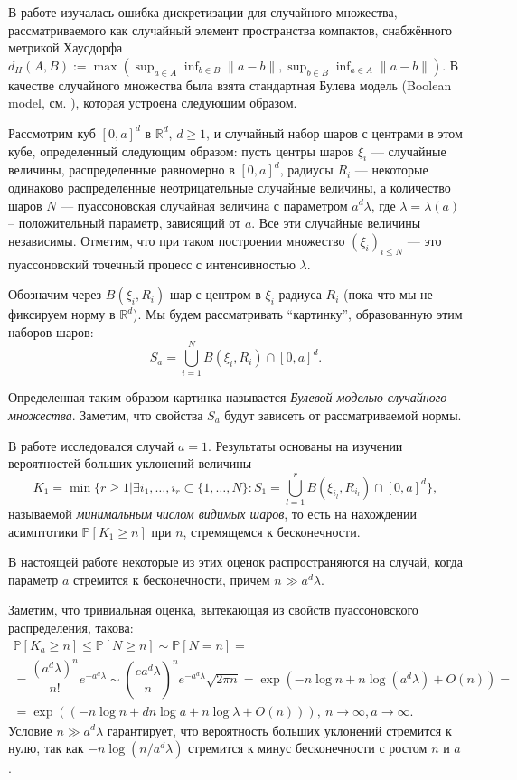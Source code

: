 \documentclass[12pt]{article}
\theoremstyle{plain}
\theoremstyle{definition}
\theoremstyle{remark}
\def\geq{\geqslant}
\def\leq{\leqslant}
\newcommand{\cuplim}{\bigcup\limits}
\newcommand{\R}{\mathbb{R}}
\newcommand{\PP}{\mathbb{P}}
\begin{document}
В работе \cite{AL} изучалась ошибка дискретизации для случайного множества,
рассматриваемого как случайный элемент пространства компактов, снабжённого метрикой Хаусдорфа $d_H(A, B) := \max(\sup_{a\in A}\inf_{b\in B}\|a - b\|, \sup_{b\in B}\inf_{a\in A}\|a - b\|)$.
В качестве случайного множества была взята стандартная Булева модель (Boolean model, см. \cite{CSKM, SW}), которая
устроена следующим образом.

Рассмотрим куб $[0,a]^d$ в $\R^d$, $d \geq 1$, и  случайный набор шаров с центрами в этом кубе, определенный следующим образом: пусть  центры шаров $\xi_i$ ---  случайные величины, распределенные равномерно в $[0,a]^d$, радиусы $R_i$ --- некоторые одинаково распределенные неотрицательные случайные величины, а количество шаров $N$ --- пуассоновская случайная величина с параметром $a^d\lambda$, где $\lambda = \lambda(a)$ -- положительный параметр, зависящий от $a$. Все эти случайные величины независимы. Отметим, что при таком построении множество $(\xi_i)_{i\leq N}$ --- это пуассоновский точечный процесс с интенсивностью $\lambda$.

Обозначим через $B(\xi_i, R_i)$ шар с центром в $\xi_i$ радиуса $R_i$ (пока что мы не фиксируем норму в $\R^d$).
Мы будем рассматривать  ``картинку'', образованную этим наборов шаров:
$$S_a = \cuplim_{i=1}^N B(\xi_i, R_i) \cap [0,a]^d.$$

Определенная таким образом картинка называется {\it Булевой моделью случайного множества}.
Заметим, что свойства $S_a$ будут зависеть от рассматриваемой нормы.

 В работе \cite{AL} исследовался случай $a=1$. Результаты   основаны на изучении вероятностей  больших уклонений величины  $$K_1 = \min \{r \geq 1 | \exists i_1, \ldots , i_r \subset \{1, \ldots , N\} : S_1 = \cuplim_{l=1}^r B(\xi_{i_l}, R_{i_l}) \cap [0,a]^d\},$$
называемой {\it минимальным числом видимых шаров}, то есть на нахождении асимптотики $\PP[K_1 \geq n]$ при $n$, стремящемся к бесконечности. 

В настоящей работе некоторые из этих оценок распространяются на случай, когда параметр $a$ стремится к бесконечности, причем $n \gg a^d\lambda$.

Заметим, что тривиальная оценка, вытекающая из свойств пуассоновского распределения, такова:
\begin{multline*}
    \PP[K_a \geq n] \leq \PP[N\geq n] \sim \PP[N = n] =\\
    = \dfrac{(a^d\lambda)^n}{n!}e^{-a^d\lambda} \sim \left(\dfrac{ea^d\lambda}{n}\right)^ne^{-a^d\lambda}\sqrt{2\pi n} = 
    \exp(-n\log n + n\log (a^d\lambda) + O(n) ) = \\
    =\exp((-n\log n + dn\log a + n\log\lambda + 
    O(n))), \ n\to \infty, a \to\infty.
\end{multline*}{}
Условие $n\gg a^d\lambda$ гарантирует, что вероятность больших уклонений стремится к нулю, так как $-n\log(n/a^d\lambda)$ стремится к минус бесконечности с ростом $n$ и $a$. 
\end{document}
